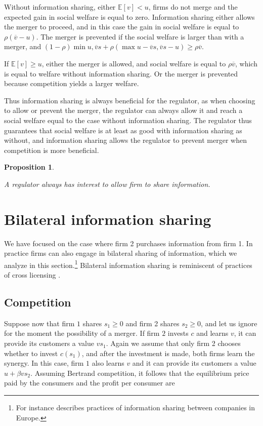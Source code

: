\documentclass[a4paper,leqno]{article}%
\newtheorem{prop}{Proposition}
\newcommand{\E}{\mathbb E}
\newcommand{\ov}{\overline{v}}
\begin{document}
\medskip

Without information sharing, either $\E[v]<u$, firms do not merge and the expected gain in social welfare is equal to zero. Information sharing either allows the merger to proceed, and in this case the gain in social welfare is equal to $\rho (\ov-u)$. The merger is prevented if the social welfare is larger than with a merger, and $(1-\rho)\min{u,\ov s}+\rho (\max{u-\ov s,\ov s-u})\geq \rho \ov$.

\medskip

If $\E[v]\geq u$, either the merger is allowed, and social welfare is equal to $\rho \ov$, which is equal to welfare without information sharing. Or the merger is prevented because competition yields a larger welfare.

\medskip

Thus information sharing is always beneficial for the regulator, as when choosing to allow or prevent the merger, the regulator can always allow it and reach a social welfare equal to the case without information sharing. The regulator thus guarantees that social welfare is at least as good with information sharing as without, and information sharing allows the regulator to prevent merger when competition is more beneficial.


\begin{prop}~~

A regulator always has interest to allow firm to share information.

\end{prop}



\section{Bilateral information sharing}

We have focused on the case where firm 2 purchases information from firm 1. In practice firms can also engage in bilateral sharing of information, which we analyze in this section.\footnote{For instance \cite{scaria2018study} describes practices of information sharing between companies in Europe.} Bilateral information sharing is reminiscent of practices of cross licensing \citep{fershtman1992cross}.


\subsection{Competition}

Suppose now that firm $1$ shares $s_1\geq 0$ and firm 2 shares $s_2\geq0$, and let us ignore for the moment the possibility of a merger. If firm $2$ invests $c$ and learns $v$, it can provide its customers a value $vs_1$. Again we assume that only firm 2 chooses whether to invest $c(s_1)$, and after the investment is made, both firms learn the synergy. In this case, firm $1$ also learns $v$ and it can provide its customers a value $u+\beta v s_2$. Assuming Bertrand competition, it follows that the equilibrium price paid by the consumers and the profit per consumer are
\end{document}
